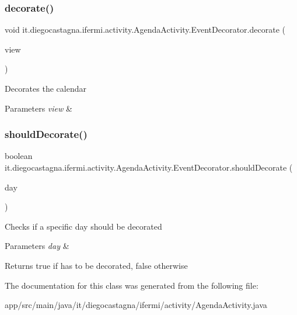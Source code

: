 \subsubsection{\texorpdfstring{decorate()}{decorate()}}
{\footnotesize\ttfamily void it.\+diegocastagna.\+ifermi.\+activity.\+Agenda\+Activity.\+Event\+Decorator.\+decorate (\begin{DoxyParamCaption}\item[{Day\+View\+Facade}]{view }\end{DoxyParamCaption})\hspace{0.3cm}{\ttfamily [inline]}}

Decorates the calendar 
\begin{DoxyParams}{Parameters}
{\em view} & \\
\hline
\end{DoxyParams}
\mbox{\label{classit_1_1diegocastagna_1_1ifermi_1_1activity_1_1_agenda_activity_1_1_event_decorator_a3b425a172186086b5eb6858e22ec4081}} 
\subsubsection{\texorpdfstring{shouldDecorate()}{shouldDecorate()}}
{\footnotesize\ttfamily boolean it.\+diegocastagna.\+ifermi.\+activity.\+Agenda\+Activity.\+Event\+Decorator.\+should\+Decorate (\begin{DoxyParamCaption}\item[{Calendar\+Day}]{day }\end{DoxyParamCaption})\hspace{0.3cm}{\ttfamily [inline]}}

Checks if a specific day should be decorated 
\begin{DoxyParams}{Parameters}
{\em day} & \\
\hline
\end{DoxyParams}
\begin{DoxyReturn}{Returns}
true if has to be decorated, false otherwise 
\end{DoxyReturn}


The documentation for this class was generated from the following file\+:\begin{DoxyCompactItemize}
\item 
app/src/main/java/it/diegocastagna/ifermi/activity/Agenda\+Activity.\+java\end{DoxyCompactItemize}

